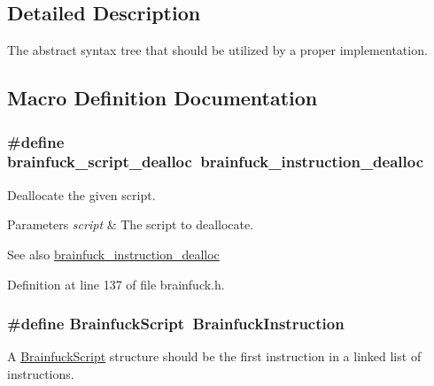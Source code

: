 \subsection{Detailed Description}
The abstract syntax tree that should be utilized by a proper implementation. 



\subsection{Macro Definition Documentation}
\hypertarget{group__ast_ga17fff4afb8ab8bd26f41724878a9997b}{}
\subsubsection[{brainfuck\+\_\+script\+\_\+dealloc}]{\setlength{\rightskip}{0pt plus 5cm}\#define brainfuck\+\_\+script\+\_\+dealloc~{\bf brainfuck\+\_\+instruction\+\_\+dealloc}}\label{group__ast_ga17fff4afb8ab8bd26f41724878a9997b}


Deallocate the given script. 


\begin{DoxyParams}{Parameters}
{\em script} & The script to deallocate. \\
\hline
\end{DoxyParams}
\begin{DoxySeeAlso}{See also}
\hyperlink{group__ast_ga2028b09c7f2692fb7fe2cee732919b2d}{brainfuck\+\_\+instruction\+\_\+dealloc} 
\end{DoxySeeAlso}


Definition at line 137 of file brainfuck.\+h.

\hypertarget{group__ast_ga9084bd8dcac602fdcbf7ca845b1e1b20}{}
\subsubsection[{Brainfuck\+Script}]{\setlength{\rightskip}{0pt plus 5cm}\#define Brainfuck\+Script~{\bf Brainfuck\+Instruction}}\label{group__ast_ga9084bd8dcac602fdcbf7ca845b1e1b20}


A \hyperlink{group__ast_ga9084bd8dcac602fdcbf7ca845b1e1b20}{Brainfuck\+Script} structure should be the first instruction in a linked list of instructions. 

